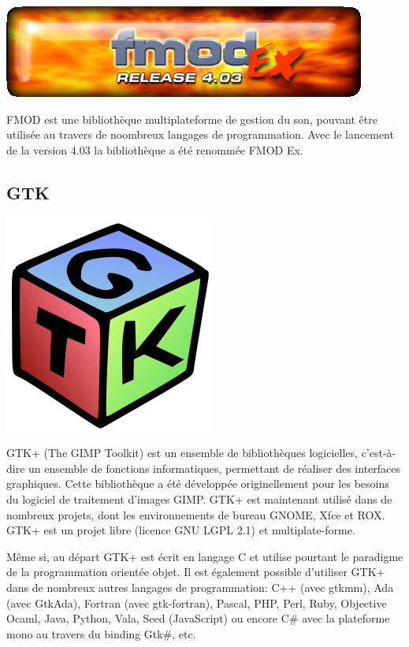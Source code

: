 \documentclass[12pt,a4paper]{report}
\begin{document}
\begin{center}
\includegraphics[scale =0.5]{fmodex.png}
\end{center}
FMOD est une bibliothèque multiplateforme de gestion du son, pouvant être utilisée au travers de noombreux langages de programmation. Avec le lancement de la version 4.03 la bibliothèque a été renommée FMOD Ex.

	\subsection{GTK}

\begin{center}
\includegraphics[scale =0.5]{GTK.jpg}
\end{center}

GTK+ (The GIMP Toolkit) est un ensemble de bibliothèques logicielles, c'est-à-dire un ensemble de fonctions informatiques, permettant de réaliser des interfaces graphiques. Cette bibliothèque a été développée originellement pour les besoins du logiciel de traitement d'images GIMP. GTK+ est maintenant utilisé dans de nombreux projets, dont les environnements de bureau GNOME, Xfce et ROX.
GTK+ est un projet libre (licence GNU LGPL 2.1) et multiplate-forme.

Même si, au départ GTK+ est écrit en langage C et utilise pourtant le paradigme de la programmation orientée objet. Il est également possible d'utiliser GTK+ dans de nombreux autres langages de programmation: C++ (avec gtkmm), Ada (avec GtkAda), Fortran (avec gtk-fortran), Pascal, PHP, Perl, Ruby, Objective Ocaml, Java, Python, Vala, Seed (JavaScript) ou encore C\# avec la plateforme mono au travers du binding Gtk\#, etc.
\end{document}
